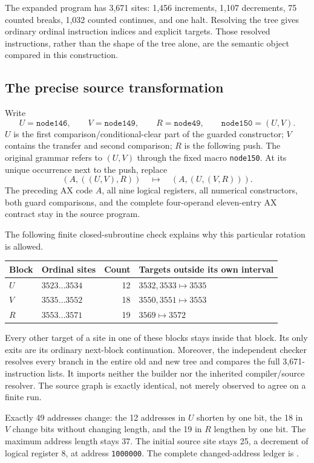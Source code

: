 \documentclass[10pt,a4paper]{article}
\theoremstyle{definition}
\begin{document}
The expanded program has 3,671 sites: 1,456 increments, 1,107 decrements,
75 counted breaks, 1,032 counted continues, and one halt. Resolving the
tree gives ordinary ordinal instruction indices and explicit targets.
Those resolved instructions, rather than the shape of the tree alone,
are the semantic object compared in this construction.

\subsection{The precise source transformation}

Write
\[
 U=\mathtt{node146},\qquad V=\mathtt{node149},\qquad
 R=\mathtt{node49},\qquad \mathtt{node150}=(U,V).
\]
$U$ is the first comparison/conditional-clear part of the guarded
constructor; $V$ contains the transfer and second comparison; $R$ is
the following push. The original grammar refers to $(U,V)$ through the
fixed macro \texttt{node150}. At its unique occurrence next to the
push, replace
\[
                (A,((U,V),R))\quad\longmapsto\quad(A,(U,(V,R))).
\label{eq:rotation}
\]
The preceding AX code $A$, all nine logical registers, all numerical
constructors, both guard comparisons, and the complete four-operand
eleven-entry AX contract stay in the source program.

The following finite closed-subroutine check explains why this particular
rotation is allowed.
\begin{center}
\begin{tabular}{llrl}
\toprule Block & Ordinal sites & Count & Targets outside its own interval\\\midrule
$U$ & $3523\ldots3534$ & 12 & $3532,3533\longmapsto3535$\\
$V$ & $3535\ldots3552$ & 18 & $3550,3551\longmapsto3553$\\
$R$ & $3553\ldots3571$ & 19 & $3569\longmapsto3572$\\
\bottomrule
\end{tabular}
\end{center}
Every other target of a site in one of these blocks stays inside that
block. Its only exits are its ordinary next-block continuation. Moreover,
the independent checker resolves every branch in the entire old and new
tree and compares the full 3,671-instruction lists. It imports neither
the builder nor the inherited compiler/source resolver. The source graph
is exactly identical, not merely observed to agree on a finite run.

Exactly 49 addresses change: the 12 addresses in $U$ shorten by one bit,
the 18 in $V$ change bits without changing length, and the 19 in $R$
lengthen by one bit. The maximum address length stays 37. The initial
source site stays 25, a decrement of logical register 8, at address
\texttt{1000000}. The complete changed-address ledger is
.
\end{document}
